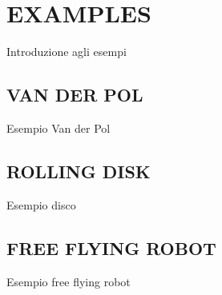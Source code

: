 \section*{EXAMPLES}
Introduzione agli esempi 

\subsection*{VAN DER POL}
Esempio Van der Pol

\subsection*{ROLLING DISK}
Esempio disco

\subsection*{FREE FLYING ROBOT}
Esempio free flying robot

\cite{latex, goosens} 